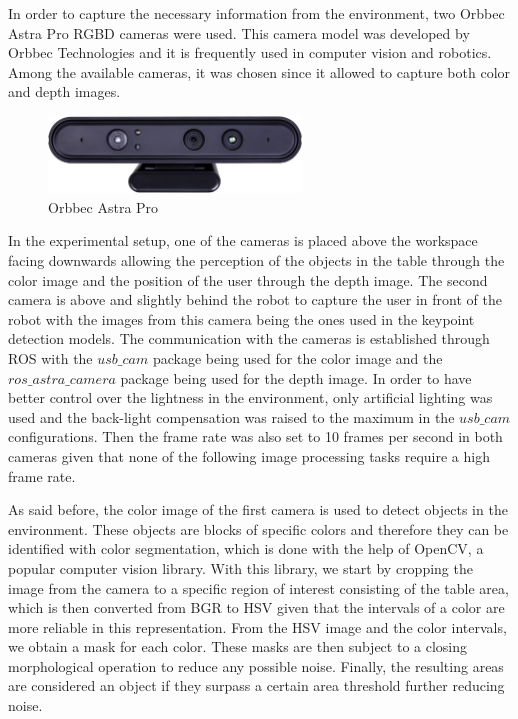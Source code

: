 
In order to capture the necessary information from the environment, two Orbbec Astra Pro RGBD cameras were used. This camera model was developed by Orbbec Technologies and it is frequently used in computer vision and robotics\cite{AstraPro}. Among the available cameras, it was chosen since it allowed to capture both color and depth images.

\begin{figure}[h]
\centerline{\includegraphics[width=0.6\textwidth]{figs/Astra.jpg}}
\caption[Orbbec Astra Pro]{Orbbec Astra Pro \cite{AstraPro}}
\label{fig:orbbec_astra_pro}
\end{figure}

In the experimental setup, one of the cameras is placed above the workspace facing downwards allowing the perception of the objects in the table through the color image and the position of the user through the depth image. The second camera is above and slightly behind the robot to capture the user in front of the robot with the images from this camera being the ones used in the keypoint detection models. The communication with the cameras is established through ROS with the $usb\_cam$ package being used for the color image and the $ros\_astra\_camera$ package being used for the depth image. In order to have better control over the lightness in the environment, only artificial lighting was used and the back-light compensation was raised to the maximum in the $usb\_cam$ configurations. Then the frame rate was also set to 10 frames per second in both cameras given that none of the following image processing tasks require a high frame rate.

As said before, the color image of the first camera is used to detect objects in the environment. These objects are blocks of specific colors and therefore they can be identified with color segmentation, which is done with the help of OpenCV, a popular computer vision library. With this library, we start by cropping the image from the camera to a specific region of interest consisting of the table area, which is then converted from BGR to HSV given that the intervals of a color are more reliable in this representation. From the HSV image and the color intervals, we obtain a mask for each color. These masks are then subject to a closing morphological operation to reduce any possible noise. Finally, the resulting areas are considered an object if they surpass a certain area threshold further reducing noise.

